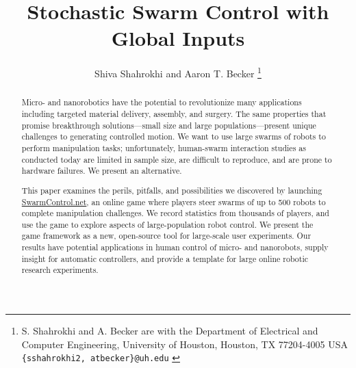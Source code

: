 \documentclass[letterpaper, 10 pt, conference]{ieeeconf}
\begin{document}


\title{\LARGE \bf 
Stochastic Swarm Control with Global Inputs
}
\author{Shiva Shahrokhi and  Aaron T. Becker%
\thanks{{S. Shahrokhi and A. Becker are with the Department of Electrical and Computer Engineering,  University of Houston, Houston, TX 77204-4005 USA {\tt\small  \{sshahrokhi2, atbecker\}@uh.edu}
}
} %
} %
\maketitle

\begin{abstract}
Micro- and nanorobotics have the potential to revolutionize many applications including targeted material delivery, assembly, and surgery.  The same properties that promise breakthrough solutions---small size and large populations---present unique challenges to generating controlled motion. We want to use large swarms of robots to perform manipulation tasks; unfortunately, human-swarm interaction studies as conducted today are limited in sample size, are difficult to reproduce, and are prone to hardware failures. We present an alternative.

This paper examines the perils, pitfalls, and possibilities we discovered by launching \href{http://www.swarmcontrol.net}{SwarmControl.net}, an online game where players steer swarms of up to 500 robots to complete manipulation challenges. We record statistics from thousands of players, and use the game to explore aspects of large-population robot control. We present the game framework as a new, open-source tool for large-scale user experiments. Our results have potential applications in human control of micro- and nanorobots, supply insight for automatic controllers, and provide a template for large online robotic research experiments.


  
   

\end{abstract}
\end{document}
